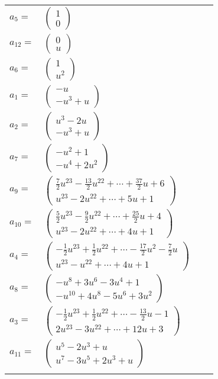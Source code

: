 \documentclass[1p]{elsarticle_modified}
\theoremstyle{definition}
\begin{document}
\begin{tabular}{m{7pt} m{180pt} m{7pt} m{180pt} }
\flushright $a_{5}=$&$\begin{pmatrix}1\\0\end{pmatrix}$ \\
\flushright $a_{12}=$&$\begin{pmatrix}0\\u\end{pmatrix}$ \\
\flushright $a_{6}=$&$\begin{pmatrix}1\\u^2\end{pmatrix}$ \\
\flushright $a_{1}=$&$\begin{pmatrix}- u\\- u^3+u\end{pmatrix}$ \\
\flushright $a_{2}=$&$\begin{pmatrix}u^3-2 u\\- u^3+u\end{pmatrix}$ \\
\flushright $a_{7}=$&$\begin{pmatrix}- u^2+1\\- u^4+2 u^2\end{pmatrix}$ \\
\flushright $a_{9}=$&$\begin{pmatrix}\frac{7}{2} u^{23}-\frac{13}{2} u^{22}+\cdots+\frac{37}{2} u+6\\u^{23}-2 u^{22}+\cdots+5 u+1\end{pmatrix}$ \\
\flushright $a_{10}=$&$\begin{pmatrix}\frac{5}{2} u^{23}-\frac{9}{2} u^{22}+\cdots+\frac{25}{2} u+4\\u^{23}-2 u^{22}+\cdots+4 u+1\end{pmatrix}$ \\
\flushright $a_{4}=$&$\begin{pmatrix}-\frac{1}{2} u^{23}+\frac{1}{2} u^{22}+\cdots-\frac{17}{2} u^2-\frac{7}{2} u\\u^{23}- u^{22}+\cdots+4 u+1\end{pmatrix}$ \\
\flushright $a_{8}=$&$\begin{pmatrix}- u^8+3 u^6-3 u^4+1\\- u^{10}+4 u^8-5 u^6+3 u^2\end{pmatrix}$ \\
\flushright $a_{3}=$&$\begin{pmatrix}-\frac{1}{2} u^{23}+\frac{1}{2} u^{22}+\cdots-\frac{13}{2} u-1\\2 u^{23}-3 u^{22}+\cdots+12 u+3\end{pmatrix}$ \\
\flushright $a_{11}=$&$\begin{pmatrix}u^5-2 u^3+u\\u^7-3 u^5+2 u^3+u\end{pmatrix}$\\&\end{tabular}
\end{document}
